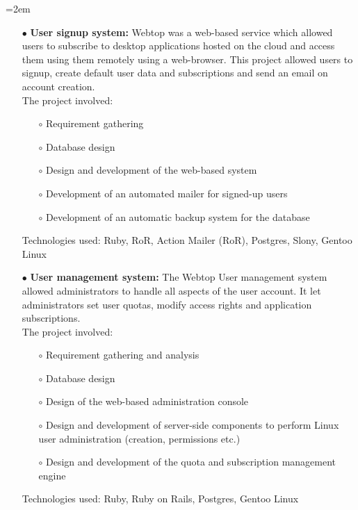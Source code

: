 \documentclass{scrartcl}
\newcommand{\MarginDate}[1]{\marginpar{\raggedleft\itshape\small#1}}
\newcommand{\Description}[1]{\hangindent=2em\hangafter=0\noindent\raggedright\footnotesize{#1}\par\normalsize}
\begin{document}
\begin{cv}{
\href{http://www.develmj.com}{}
}
\vspace{0.5em}

\Description{
\begin{itemize}
\item[\footnotesize$\bullet$] \textbf{User signup system: }Webtop was a web-based service which \MarginDate{Atlantis Webtop}allowed users to
    subscribe to desktop applications hosted on the cloud and access them using
    them remotely using a web-browser. This project allowed users to signup,
    create default user data and subscriptions and send an email on account
    creation.\\
    The project involved:
{\scriptsize
    \begin{itemize}
    \item[\footnotesize$\circ$] Requirement gathering
    \item[\footnotesize$\circ$] Database design
    \item[\footnotesize$\circ$] Design and development of the
      web-based system
    \item[\footnotesize$\circ$] Development of an automated mailer for
      signed-up users
    \item[\footnotesize$\circ$] Development of an automatic backup
      system for the database
    \end{itemize}}
    Technologies used: Ruby, RoR, Action Mailer (RoR), Postgres, Slony,
Gentoo Linux
  \item[\footnotesize$\bullet$] \textbf{User management system: }The Webtop User management system allowed
administrators to handle all aspects of the user account. It let administrators
set user quotas, modify access rights and application subscriptions.\\
The project involved:
{\scriptsize
    \begin{itemize}
    \item[\footnotesize$\circ$] Requirement gathering and analysis
    \item[\footnotesize$\circ$] Database design
    \item[\footnotesize$\circ$] Design of the web-based administration console
    \item[\footnotesize$\circ$] Design and development of server-side components to perform Linux
      user administration (creation, permissions etc.)
    \item[\footnotesize$\circ$] Design and development of the quota and subscription management
engine
    \end{itemize}}
    Technologies used: Ruby, Ruby on Rails, Postgres, Gentoo Linux

\end{itemize}}
\end{cv}
\end{document}
